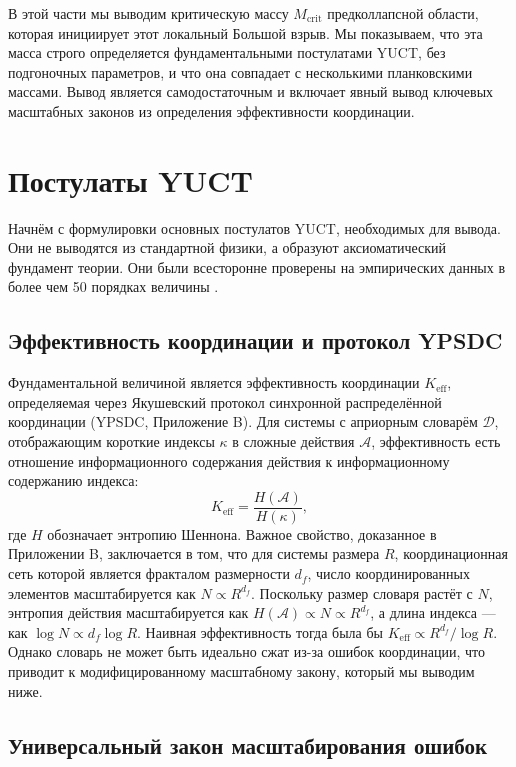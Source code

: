\documentclass[11pt,a4paper]{article}
\newcommand{\Keff}{K_{\mathrm{eff}}}
\begin{document}
	В этой части мы выводим критическую массу \(M_{\mathrm{crit}}\) предколлапсной области, которая инициирует этот локальный Большой взрыв. Мы показываем, что эта масса строго определяется фундаментальными постулатами YUCT, без подгоночных параметров, и что она совпадает с несколькими планковскими массами. Вывод является самодостаточным и включает явный вывод ключевых масштабных законов из определения эффективности координации.
	
	\section{Постулаты YUCT}
	
	Начнём с формулировки основных постулатов YUCT, необходимых для вывода. Они не выводятся из стандартной физики, а образуют аксиоматический фундамент теории. Они были всесторонне проверены на эмпирических данных в более чем 50 порядках величины \cite{AppendixL}.
	
	\subsection{Эффективность координации и протокол YPSDC}
	
	Фундаментальной величиной является эффективность координации \(K_{\mathrm{eff}}\), определяемая через Якушевский протокол синхронной распределённой координации (YPSDC, Приложение B). Для системы с априорным словарём \(\mathcal{D}\), отображающим короткие индексы \(\kappa\) в сложные действия \(\mathcal{A}\), эффективность есть отношение информационного содержания действия к информационному содержанию индекса:
	\begin{equation}
		\Keff = \frac{H(\mathcal{A})}{H(\kappa)},
		\label{eq:keff-def}
	\end{equation}
	где \(H\) обозначает энтропию Шеннона. Важное свойство, доказанное в Приложении B, заключается в том, что для системы размера \(R\), координационная сеть которой является фракталом размерности \(d_f\), число координированных элементов масштабируется как \(N \propto R^{d_f}\). Поскольку размер словаря растёт с \(N\), энтропия действия масштабируется как \(H(\mathcal{A}) \propto N \propto R^{d_f}\), а длина индекса — как \(\log N \propto d_f \log R\). Наивная эффективность тогда была бы \(\Keff \propto R^{d_f} / \log R\). Однако словарь не может быть идеально сжат из-за ошибок координации, что приводит к модифицированному масштабному закону, который мы выводим ниже.
	
	\subsection{Универсальный закон масштабирования ошибок}
	
\end{document}
